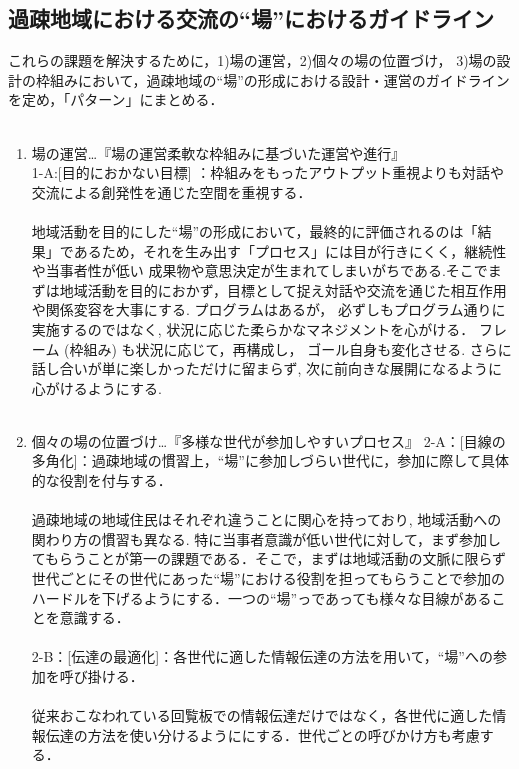 \documentclass[a4paper]{jsarticle}
\begin{document}
\subsection{過疎地域における交流の“場”におけるガイドライン}

これらの課題を解決するために，1)場の運営，2)個々の場の位置づけ， 3)場の設計の枠組みにおいて，過疎地域の“場”の形成における設計・運営のガイドラインを定め，「パターン」にまとめる．\\\\
\begin{enumerate}
\item 場の運営…『場の運営柔軟な枠組みに基づいた運営や進行』\\
1-A:[目的におかない目標] ：枠組みをもったアウトプット重視よりも対話や交流による創発性を通じた空間を重視する．\\\\
地域活動を目的にした“場”の形成において，最終的に評価されるのは「結果」であるため，それを生み出す「プロセス」には目が行きにくく，継続性や当事者性が低い
成果物や意思決定が生まれてしまいがちである.そこでまずは地域活動を目的におかず，目標として捉え対話や交流を通じた相互作用や関係変容を大事にする. プログラムはあるが， 必ずしもプログラム通りに実施するのではなく, 状況に応じた柔らかなマネジメントを心がける． フレーム (枠組み) も状況に応じて，再構成し， ゴール自身も変化させる. さらに話し合いが単に楽しかっただけに留まらず, 次に前向きな展開になるように心がけるようにする.\\\\

\item 個々の場の位置づけ…『多様な世代が参加しやすいプロセス』
2-A：[目線の多角化]：過疎地域の慣習上，“場”に参加しづらい世代に，参加に際して具体的な役割を付与する．\\\\
過疎地域の地域住民はそれぞれ違うことに関心を持っており, 地域活動への関わり方の慣習も異なる. 特に当事者意識が低い世代に対して，まず参加してもらうことが第一の課題である．そこで，まずは地域活動の文脈に限らず世代ごとにその世代にあった“場”における役割を担ってもらうことで参加のハードルを下げるようにする．一つの“場”っであっても様々な目線があることを意識する．\\\\

2-B：[伝達の最適化]：各世代に適した情報伝達の方法を用いて，“場”への参加を呼び掛ける．\\\\
従来おこなわれている回覧板での情報伝達だけではなく，各世代に適した情報伝達の方法を使い分けるようににする．世代ごとの呼びかけ方も考慮する．\\\\



\end{enumerate}
\end{document}
